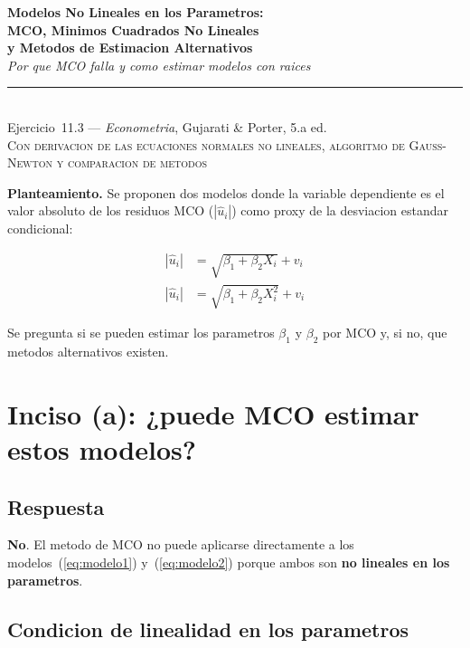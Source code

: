 \documentclass[12pt, letterpaper]{article}
\theoremstyle{remark}
\begin{document}
\begin{center}
  {\LARGE\bfseries Modelos No Lineales en los Parametros:}\\[6pt]
  {\LARGE\bfseries MCO, Minimos Cuadrados No Lineales}\\[6pt]
  {\LARGE\bfseries y Metodos de Estimacion Alternativos}\\[12pt]
  {\large\itshape Por que MCO falla y como estimar modelos con raices}\\[14pt]
  \rule{0.55\linewidth}{0.6pt}\\[8pt]
  {\normalsize Ejercicio~11.3 --- \textit{Econometria}, Gujarati \& Porter, 5.a ed.}\\[4pt]
  {\small\textsc{Con derivacion de las ecuaciones normales no lineales, algoritmo de Gauss-Newton
  y comparacion de metodos}}
\end{center}

\vspace{10pt}

\noindent\textbf{Planteamiento.}\quad
Se proponen dos modelos donde la variable dependiente es el valor absoluto de
los residuos MCO ($|\hat u_i|$) como proxy de la desviacion estandar condicional:

\begin{align}
  |\hat u_i| &= \sqrt{\beta_1 + \beta_2 X_i} + v_i
  \tag{I}\label{eq:modelo1}\\[4pt]
  |\hat u_i| &= \sqrt{\beta_1 + \beta_2 X_i^2} + v_i
  \tag{II}\label{eq:modelo2}
\end{align}

\noindent Se pregunta si se pueden estimar los parametros $\beta_1$ y $\beta_2$
por MCO y, si no, que metodos alternativos existen.

\section{Inciso (a): ¿puede MCO estimar estos modelos?}

\subsection{Respuesta}

\textbf{No}. El metodo de MCO no puede aplicarse directamente a
los modelos~(\ref{eq:modelo1}) y~(\ref{eq:modelo2}) porque ambos son
\textbf{no lineales en los parametros}.

\subsection{Condicion de linealidad en los parametros}
\end{document}
